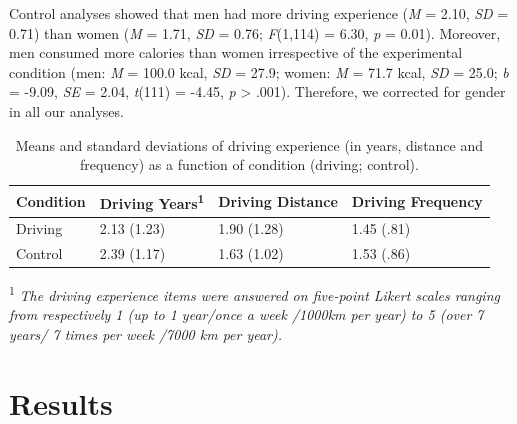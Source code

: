 \documentclass[authordate, empirical, issue]{jote-new-article}
\begin{document}
Control analyses showed that men had more driving experience (\emph{M} = 2.10, \emph{SD} = 0.71) than women (\emph{M} = 1.71, \emph{SD} = 0.76; \emph{F}(1,114) = 6.30, \emph{p }= 0.01). Moreover, men consumed more calories than women irrespective of the experimental condition (men: \emph{M} = 100.0 kcal, \emph{SD} = 27.9; women: \emph{M} = 71.7 kcal, \emph{SD} = 25.0; \emph{b }= -9.09, \emph{SE }= 2.04, \emph{t}(111) = -4.45, \emph{p} > .001). Therefore, we corrected for gender in all our analyses.





\begin{table}[t]
  \begin{fullwidth}
    \caption{ Means and standard deviations of driving experience (in years, distance and frequency) as a function of condition (driving; control).}
    \label{tab:tab1}
    \begin{tabularx}{\linewidth}{@{} X X X X @{}}
      \toprule

      \textbf{Condition} & \textbf{Driving Years}\textsuperscript{\textbf{1}}
                         & \textbf{Driving }\newline\textbf{Distance}         & \textbf{Driving }\newline \textbf{Frequency}              \\
      \midrule

      Driving            & 2.13 (1.23)                                        & 1.90 (1.28)                                  & 1.45 (.81) \\

      Control            & 2.39 (1.17)                                        & 1.63 (1.02)                                  & 1.53 (.86) \\
      \bottomrule
    \end{tabularx}

    \textsuperscript{1} \emph{\small The driving experience items were answered on five-point Likert scales ranging from respectively 1 (up to 1 year/once a week /1000km per year) to 5 (over 7 years/ 7 times per week /7000 km per year).}

  \end{fullwidth}
\end{table}



\section{Results}
\end{document}

